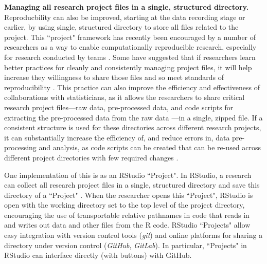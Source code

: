 \documentclass[pdftex,english,11pt,parskip=half]{scrartcl}
\begin{document}
\textbf{Managing all research project files in a single, structured directory.}
Reproducbility can also be improved, starting at the data recording stage or
earlier, by using single, structured directory to store all files related to the
project. This ``project" framework has recently been encouraged by a number of
researchers as a way to enable computationally reproducible research, especially
for research conducted by teams \cite{marwick2018packaging,
parker2017opinionated, lowndes2017our}. Some have suggested that if researchers learn better practices for cleanly and consistently managing project files, it will help increase they willingness to share those files and so meet standards of reproducibility \cite{marwick2018packaging}. This practice can also improve the efficiency and effectiveness of collaborations with statisticians, as it allows the researchers to share critical research project files---raw data, pre-processed data, and code scripts for extracting the pre-processed data from the raw data \cite{ellis2018share, shade2015computing}---in a single, zipped file. If a consistent structure is used for these directories across different research projects, it can substantially increase the efficiency of, and reduce errors in, data pre-processing and analysis, as code scripts can be created that can be re-used across different project directories with few required changes \cite{marwick2018packaging}.

One implementation of this is as an RStudio ``Project". In RStudio, a research can collect all research project files in a single, structured directory and save this directory of a ``Project" \cite{rstudiousingprojects}. When the researcher opens this ``Project", RStudio is open with the working directory set to the top level of the project directory, encouraging the use of transportable relative pathnames in code that reads in and writes out data and other files from the R code. RStudio ``Projects" allow easy integration with version control tools (\textit{git}) and online platforms for sharing a directory under version control (\textit{GitHub}, \textit{GitLab}). In particular, ``Projects" in RStudio can interface directly (with buttons) with GitHub. 
\end{document}
